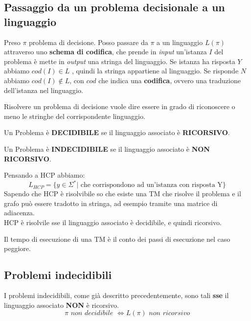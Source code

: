 \subsection{Passaggio da un problema decisionale a un linguaggio}
\begin{definizione}
  Preso $\pi$ problema di decisione. Posso passare da $\pi$ a un linguaggio
  $L(\pi)$ attraverso uno \textbf{schema di codifica}, che prende in \textit{input}
  un'istanza $I$ del problema è mette in \textit{output} una stringa del linguaggio. Se
  istanza ha risposta $Y$ abbiamo $cod(I)\in L$ , quindi la stringa appartiene al linguaggio. Se risponde $N$ abbiamo $cod(I)\not\in
  L$, con $cod$ che indica una 
  \textbf{codifica}, ovvero una traduzione dell'istanza nel linguaggio.\\
\end{definizione}
Risolvere un problema di decisione vuole dire essere in grado di riconoscere o meno le stringhe del corrispondente linguaggio.
\begin{definizione}
  Un Problema è \textbf{DECIDIBILE} se il linguaggio associato è \textbf{RICORSIVO}. 
\end{definizione}
\begin{definizione}
  Un Problema è \textbf{INDECIDIBILE} se il linguaggio associato è \textbf{NON RICORSIVO}. 
\end{definizione}
\begin{esempio}
  Pensando a HCP abbiamo:
  \[L_{HCP}=\{y\in \Sigma^*|\mbox{ che corrispondono ad un'istanza con risposta
      Y}\}\]
  Sapendo che HCP è risolvibile so che esiste una TM che risolve il problema e
  il grafo può essere tradotto in stringa, ad esempio tramite una matrice di
  adiacenza.\\
  HCP è risolvile sse il linguaggio associato è decidibile, e quindi ricorsivo.
\end{esempio}
\begin{definizione}
  Il tempo di esecuzione di una TM è il conto dei passi di esecuzione nel caso
  peggiore.
\end{definizione}
\newpage
\subsection{Problemi indecidibili}
I problemi indecidibili, come già descritto precedentemente, sono tali \textbf{sse} il linguaggio associato \textbf{NON} è ricorsivo.
\[\pi \,\, non\,\,decidibile\,\, \iff L(\pi)\,\,non \,\,ricorsivo\]
